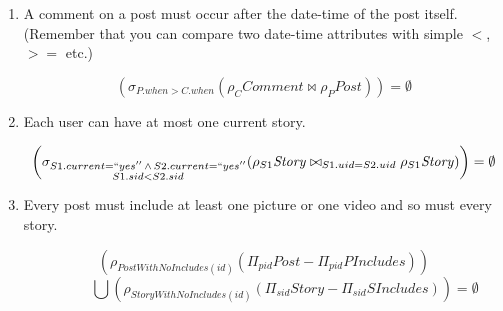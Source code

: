 \documentclass{article}
\newcommand{\var}[1]{\mathit{#1}}
\begin{document}
\begin{enumerate}

\item   %
A comment on a post must occur after the date-time of the post itself.
(Remember that you can compare two date-time attributes with simple $<$,
$>=$ etc.)

{\large  

\[
    \left( 
        \sigma_{P.when > C.when}
        (\rho_{C}\var{Comment} \bowtie \rho_{P} \var{Post})    
    \right)
    =\emptyset
\]

}

\item %
Each user can have at most one current story.


{\large 

\[
    \left(
    \sigma_{
        \substack{
            S1.current=``yes''\,\land\, S2.current=``yes'' \\ 
            S1.sid < S2.sid
        }
    }
    (\rho_{S1}\var{Story} \bowtie_{S1.uid=S2.uid} \rho_{S1} \var{Story})
    \right) = \emptyset
\]
}

\item %
Every post must include at least one picture or one video and so must every story.

{\large 

\[
    \left(
        \rho_{\var{PostWithNoIncludes}(id)}
        (\Pi_{pid} \var{Post} - \Pi_{pid} \var{PIncludes})
    \right)
\]
\[
    \quad \quad \quad \bigcup
    \left(
        \rho_{\var{StoryWithNoIncludes}(id)}
        (\Pi_{sid} \var{Story} - \Pi_{sid} \var{SIncludes})
    \right)
    = \emptyset
\]
}

\end{enumerate}
\end{document}
